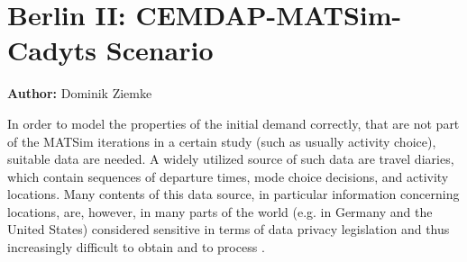 \section{Berlin II: CEMDAP-MATSim-Cadyts Scenario}
\label{sec:berlinII}
\hfill \textbf{Author:} Dominik Ziemke



In order to model the properties of the initial demand correctly, that are not part of the MATSim iterations in a certain study (such as usually activity choice), suitable data are needed. A widely utilized source of such data are travel diaries, which contain sequences of departure times, mode choice decisions, and activity locations.
Many contents of this data source, in particular information concerning locations, are, however, in many parts of the world (e.g. in Germany and the United States) considered sensitive in terms of data privacy legislation and thus increasingly difficult to obtain and to process \citep{ZiemkeNagelBhat2015IntegratingCemdapMatsimTransferabilityTRB}.

